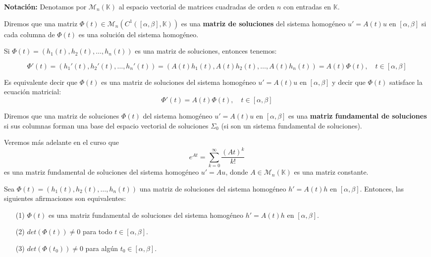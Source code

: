 \textbf{Notación:} Denotamos por $\mathcal{M}_n(\mathbb{K})$ al espacio vectorial de matrices cuadradas de orden $n$ con entradas en $\mathbb{K}$.

\begin{definición} 
    Diremos que una matriz $\Phi(t) \in \mathcal{M}_n(C^1([\alpha, \beta], \mathbb{K}))$ es una \textbf{matriz de soluciones} del sistema homogéneo $u' = A(t) u$ en $[\alpha, \beta]$ si cada columna de $\Phi(t)$ es una solución del sistema homogéneo.
\end{definición}

Si $\Phi(t) = (h_1(t), h_2(t), \ldots, h_n(t))$ es una matriz de soluciones, entonces tenemos:

\[
    \Phi'(t) = (h_1'(t), h_2'(t), \ldots, h_n'(t)) = (A(t) h_1(t), A(t) h_2(t), \ldots, A(t) h_n(t)) = A(t) \Phi(t), \quad t \in [\alpha, \beta]
\]

Es equivalente decir que $\Phi(t)$ es una matriz de soluciones del sistema homogéneo $u' = A(t) u$ en $[\alpha, \beta]$ y decir que $\Phi(t)$ satisface la ecuación matricial:
\[
    \Phi'(t) = A(t) \Phi(t), \quad t \in [\alpha, \beta]
\]

\begin{definición} 
    Diremos que una matriz de soluciones $\Phi(t)$ del sistema homogéneo $u' = A(t) u$ en $[\alpha, \beta]$ es una \textbf{matriz fundamental de soluciones} si sus columnas forman una base del espacio vectorial de soluciones $\Sigma_0$ (si son un sistema fundamental de soluciones).
\end{definición}

Veremos más adelante en el curso que 
\[
    e^{At} = \sum_{k=0}^{\infty} \frac{(A t)^k}{k!}
\]
es una matriz fundamental de soluciones del sistema homogéneo $u' = A u$, donde $A \in \mathcal{M}_n(\mathbb{K})$ es una matriz constante.

\begin{teorema}
    Sea $\Phi(t) = (h_1(t), h_2(t), \ldots, h_n(t))$ una matriz de soluciones del sistema homogéneo $h' = A(t) h$ en $[\alpha, \beta]$. Entonces, las siguientes afirmaciones son equivalentes:
    \begin{itemize}
        \item[(1)] $\Phi(t)$ es una matriz fundamental de soluciones del sistema homogéneo $h' = A(t) h$ en $[\alpha, \beta]$.
        \item[(2)] $det(\Phi(t)) \neq 0$ para todo $t \in [\alpha, \beta]$.
        \item[(3)] $det(\Phi(t_0)) \neq 0$ para algún $t_0 \in [\alpha, \beta]$.
    \end{itemize}
\end{teorema}

